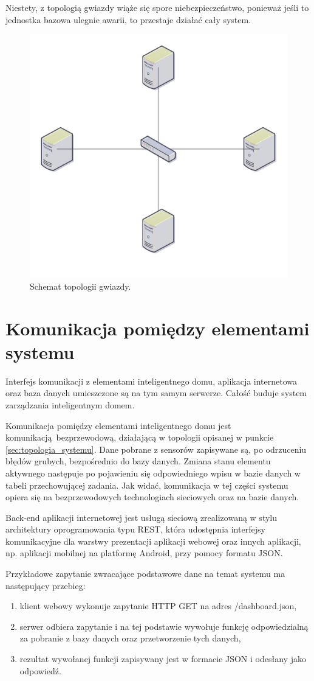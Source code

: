 \documentclass[eng,oneside]{mgr}
\begin{document}
Niestety, z topologią gwiazdy wiąże się spore niebezpieczeństwo, ponieważ jeśli to jednostka bazowa ulegnie awarii, to przestaje działać cały system. 

\begin{figure}[h]
\centering
\includegraphics[width=0.6\linewidth]{topologia_gwiazdy}
\caption{Schemat topologii gwiazdy.}
\label{fig:star-network}
\end{figure}

\section{Komunikacja pomiędzy elementami systemu} %
\label{sec:komunikacja_pomi_dzy_elementami_systemu}
Interfejs komunikacji z elementami inteligentnego domu, aplikacja internetowa oraz baza danych umieszczone są na tym samym serwerze. Całość buduje system zarządzania inteligentnym domem.

Komunikacja pomiędzy elementami inteligentnego domu jest komunikacją bezprzewodową, działającą w topologii opisanej w punkcie \ref{sec:topologia_systemu}. Dane pobrane z sensorów zapisywane są, po odrzuceniu błędów grubych, bezpośrednio do bazy danych. Zmiana stanu elementu aktywnego następuje po pojawieniu się odpowiedniego wpisu w bazie danych w tabeli przechowującej zadania. Jak widać, komunikacja w tej części systemu opiera się na bezprzewodowych technologiach sieciowych oraz na bazie danych.

Back-end aplikacji internetowej jest usługą sieciową zrealizowaną w stylu architektury oprogramowania typu REST, która udostępnia interfejsy komunikacyjne dla warstwy prezentacji aplikacji webowej oraz innych aplikacji, np. aplikacji mobilnej na platformę Android, przy pomocy formatu JSON.

Przykładowe zapytanie zwracające podstawowe dane na temat systemu ma następujący przebieg:
\begin{enumerate}
	\item klient webowy wykonuje zapytanie HTTP GET na adres /dashboard.json,
	\item serwer odbiera zapytanie i na tej podstawie wywołuje funkcję odpowiedzialną za pobranie z bazy danych oraz przetworzenie tych danych, 
	\item rezultat wywołanej funkcji zapisywany jest w formacie JSON i odesłany jako odpowiedź.
\end{enumerate}
\end{document}
